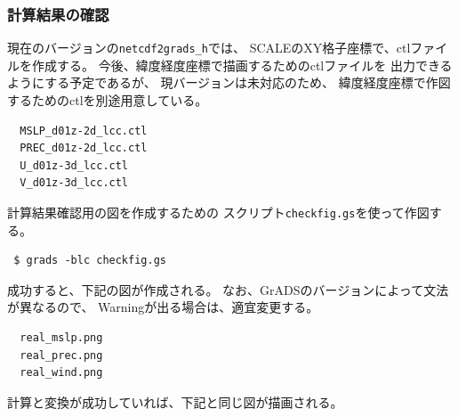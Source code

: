 \subsubsection{計算結果の確認}
現在のバージョンの\verb|netcdf2grads_h|では、
SCALEのXY格子座標で、ctlファイルを作成する。
今後、緯度経度座標で描画するためのctlファイルを
出力できるようにする予定であるが、
現バージョンは未対応のため、
緯度経度座標で作図するためのctlを別途用意している。
\begin{verbatim}
  MSLP_d01z-2d_lcc.ctl
  PREC_d01z-2d_lcc.ctl
  U_d01z-3d_lcc.ctl
  V_d01z-3d_lcc.ctl
\end{verbatim}

計算結果確認用の図を作成するための
スクリプト\verb|checkfig.gs|を使って作図する。
\begin{verbatim}
 $ grads -blc checkfig.gs
\end{verbatim}
成功すると、下記の図が作成される。
なお、GrADSのバージョンによって文法が異なるので、
Warningが出る場合は、適宜変更する。
\begin{verbatim}
  real_mslp.png
  real_prec.png
  real_wind.png
\end{verbatim}
計算と変換が成功していれば、下記と同じ図が描画される。

